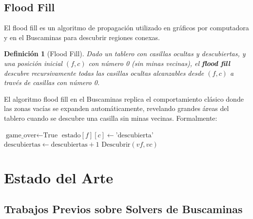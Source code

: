 \documentclass[12pt,a4paper]{article}
\newtheorem{definition}{Definición}[section]
\begin{document}
\subsection{Flood Fill}

El flood fill es un algoritmo de propagación utilizado en gráficos por computadora y en el Buscaminas para descubrir regiones conexas.

\begin{definition}[Flood Fill]
Dado un tablero con casillas ocultas y descubiertas, y una posición inicial $(f, c)$ con número 0 (sin minas vecinas), el \textbf{flood fill} descubre recursivamente todas las casillas ocultas alcanzables desde $(f, c)$ a través de casillas con número 0.
\end{definition}

El algoritmo flood fill en el Buscaminas replica el comportamiento clásico donde las zonas vacías se expanden automáticamente, revelando grandes áreas del tablero cuando se descubre una casilla sin minas vecinas. Formalmente:

\begin{algorithm}[H]
\caption{Flood Fill en Buscaminas}
\label{alg:floodfill}
\begin{algorithmic}[1]
        \State \Return
    \EndIf
        \State \Return
    \EndIf
        \State $\text{game\_over} \gets \text{True}$
        \State \Return
    \EndIf
    \State $\text{estado}[f][c] \gets \text{'descubierta'}$
    \State $\text{descubiertas} \gets \text{descubiertas} + 1$
                \State $\text{Descubrir}(vf, vc)$ 
            \EndIf
        \EndFor
    \EndIf
\EndProcedure
\end{algorithmic}
\end{algorithm}

\section{Estado del Arte}

\subsection{Trabajos Previos sobre Solvers de Buscaminas}
\end{document}

